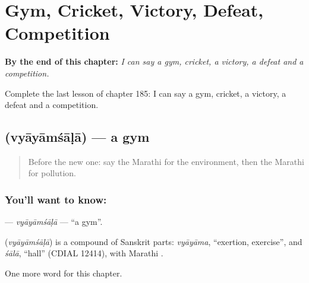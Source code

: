 
\chapter{Gym, Cricket, Victory, Defeat, Competition}
\label{ch:mr-gym-cricket-victory-defeat-competition}

\begin{chapteropening}
\textbf{By the end of this chapter:} \emph{I can say a gym, cricket, a victory, a defeat and a competition.}

Complete the last lesson of chapter 185: I can say a gym, cricket, a victory, a defeat and a competition.
\end{chapteropening}

\section[\texorpdfstring{\mr{व्यायामशाळा} (vyāyāmśāḷā)}{व्यायामशाळा (vyāyāmśāḷā)}]{ (vyāyāmśāḷā) — a gym}

\label{lesson:MR-C185-vyayamsala}



\begin{quote}
Before the new one: say the Marathi for the environment, then the Marathi for pollution.
\end{quote}

\subsection*{You'll want to know: }
\textbf{} — \emph{vyāyāmśāḷā} — \textquotedblleft{}a gym\textquotedblright{}.

\begin{cousinweb}
\textbf{} (\emph{vyāyāmśāḷā}) is a compound of Sanskrit parts: \emph{vyāyāma}, \textquotedblleft{}exertion, exercise\textquotedblright{}, and \emph{śālā}, \textquotedblleft{}hall\textquotedblright{} (CDIAL 12414), with Marathi \textbf{}.
\end{cousinweb}

\begin{grammarlens}[title={What you've built}]
One more word for this chapter.
\end{grammarlens}

